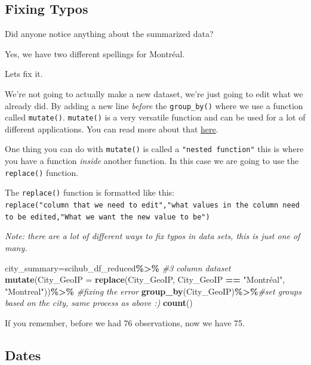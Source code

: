 \documentclass[
]{article}
\newenvironment{Shaded}{\begin{snugshade}}{\end{snugshade}}
\newcommand{\AttributeTok}[1]{\textcolor[rgb]{0.13,0.29,0.53}{#1}}
\newcommand{\CommentTok}[1]{\textcolor[rgb]{0.56,0.35,0.01}{\textit{#1}}}
\newcommand{\FunctionTok}[1]{\textcolor[rgb]{0.13,0.29,0.53}{\textbf{#1}}}
\newcommand{\NormalTok}[1]{#1}
\newcommand{\OtherTok}[1]{\textcolor[rgb]{0.56,0.35,0.01}{#1}}
\newcommand{\SpecialCharTok}[1]{\textcolor[rgb]{0.81,0.36,0.00}{\textbf{#1}}}
\newcommand{\StringTok}[1]{\textcolor[rgb]{0.31,0.60,0.02}{#1}}
\begin{document}
\subsection{Fixing Typos}\label{fixing-typos}

Did anyone notice anything about the summarized data?

Yes, we have two different spellings for Montréal.

Lets fix it.

We're not going to actually make a new dataset, we're just going to edit
what we already did. By adding a new line \emph{before} the
\texttt{group\_by()} where we use a function called \texttt{mutate()}.
\texttt{mutate()} is a very versatile function and can be used for a lot
of different applications. You can read more about that
\href{https://bookdown.org/yih_huynh/Guide-to-R-Book/mutate.html}{here}.

One thing you can do with \texttt{mutate()} is called a
\texttt{"nested\ function"} this is where you have a function
\emph{inside} another function. In this case we are going to use the
\texttt{replace()} function.

The \texttt{replace()} function is formatted like this:
\texttt{replace("column\ that\ we\ need\ to\ edit","what\ values\ in\ the\ column\ need\ to\ be\ edited,"What\ we\ want\ the\ new\ value\ to\ be")}

\emph{Note: there are a lot of different ways to fix typos in data sets,
this is just one of many.}

\begin{Shaded}
\begin{Highlighting}[]
\NormalTok{city\_summary}\OtherTok{=}\NormalTok{scihub\_df\_reduced}\SpecialCharTok{\%\textgreater{}\%} \CommentTok{\#3 column dataset }
  \FunctionTok{mutate}\NormalTok{(}\AttributeTok{City\_GeoIP =} \FunctionTok{replace}\NormalTok{(City\_GeoIP, City\_GeoIP }\SpecialCharTok{==} \StringTok{"Montréal"}\NormalTok{, }\StringTok{"Montreal"}\NormalTok{))}\SpecialCharTok{\%\textgreater{}\%} \CommentTok{\#fixing the error }
  \FunctionTok{group\_by}\NormalTok{(City\_GeoIP)}\SpecialCharTok{\%\textgreater{}\%}\CommentTok{\#set groups based on the city, same process as above :) }
  \FunctionTok{count}\NormalTok{()}
\end{Highlighting}
\end{Shaded}

If you remember, before we had 76 observations, now we have 75.

\subsection{Dates}\label{dates}
\end{document}
